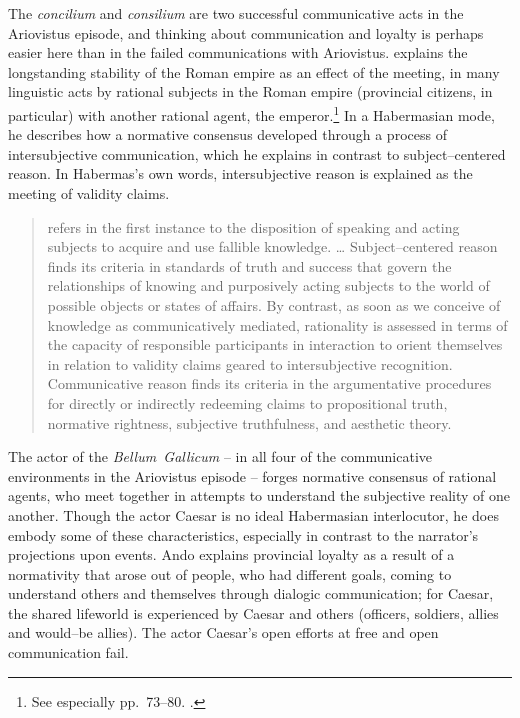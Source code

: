 \documentclass[12pt,letterpaper,oneside,final]{memoir}
\begin{document}
The \emph{concilium} and \emph{consilium} are two successful communicative acts in the Ariovistus episode, and thinking about communication and loyalty is perhaps easier here than in the failed communications with Ariovistus. \textcite{ando2000} explains the longstanding stability of the Roman empire as an effect of the meeting, in many linguistic acts by rational subjects in the Roman empire (provincial citizens, in particular) with another rational agent, the emperor.\footnote{See especially pp.~73--80. .} In a Habermasian mode, he describes how a normative consensus developed through a process of intersubjective communication, which he explains in contrast to subject--centered reason. In Habermas's own words, intersubjective reason is explained as the meeting of validity claims. \blockquote[{\cite[314]{habermas1987a}}]{ refers in the first instance to the disposition of speaking and acting subjects to acquire and use fallible knowledge. \ldots{} Subject--centered reason finds its criteria in standards of truth and success that govern the relationships of knowing and purposively acting subjects to the world of possible objects or states of affairs. By contrast, as soon as we conceive of knowledge as communicatively mediated, rationality is assessed in terms of the capacity of responsible participants in interaction to orient themselves in relation to validity claims geared to intersubjective recognition. Communicative reason finds its criteria in the argumentative procedures for directly or indirectly redeeming claims to propositional truth, normative rightness, subjective truthfulness, and aesthetic theory.} The actor of the \emph{Bellum~Gallicum} -- in all four of the communicative environments in the Ariovistus episode -- forges normative consensus of rational agents, who meet together in attempts to understand the subjective reality of one another. Though the actor Caesar is no ideal Habermasian interlocutor, he does embody some of these characteristics, especially in contrast to the narrator's projections upon events. Ando explains provincial loyalty as a result of a normativity that arose out of people, who had different goals, coming to understand others and themselves through dialogic communication; for Caesar, the shared lifeworld is experienced by Caesar and others (officers, soldiers, allies and would--be allies). The actor Caesar's open efforts at free and open communication fail.
\end{document}
